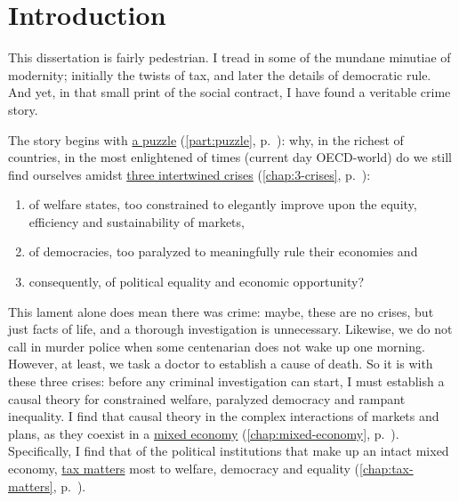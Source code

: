 
\chapter{Introduction} \label{chap:introduction-phd} 



This dissertation is fairly pedestrian. 
I tread in some of the mundane minutiae of modernity; initially the twists of tax, and later the details of democratic rule. 
And yet, in that small print of the social contract, I have found a veritable crime story.

The story begins with \hyperref[part:puzzle]{a puzzle} (\autoref{part:puzzle}, p.~\pageref{part:puzzle}): why, in the richest of countries, in the most enlightened of times (current day \gls{OECD}-world) do we still find ourselves amidst \hyperref[chap:3-crises]{three intertwined crises} (\autoref{chap:3-crises}, p.~\pageref{chap:3-crises}): 
\begin{enumerate}
	\item 
		of welfare states, too constrained to elegantly improve upon the equity, efficiency and sustainability of markets,
	\item 
		of democracies, too paralyzed to meaningfully rule their economies and
	\item 
		consequently, of political equality and economic opportunity? 
\end{enumerate}
This lament alone does mean there was crime: maybe, these are no crises, but just facts of life, and a thorough investigation is unnecessary. 
Likewise, we do not call in murder police when some centenarian does not wake up one morning.
However, at least, we task a doctor to establish a cause of death. 
So it is with these three crises: before any criminal investigation can start, I must establish a causal theory for constrained welfare, paralyzed democracy and rampant inequality. 
I find that causal theory in the complex interactions of markets and plans, as they coexist in a \hyperref[chap:mixed-economy]{mixed economy} (\autoref{chap:mixed-economy}, p.~\pageref{chap:mixed-economy}). 
Specifically, I find that of the political institutions that make up an intact mixed economy, \hyperref[chap:tax-matters]{tax matters} most to welfare, democracy and equality (\autoref{chap:tax-matters}, p.~\pageref{chap:tax-matters}).


